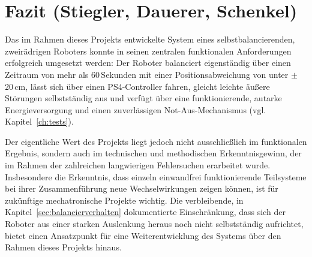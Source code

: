 \documentclass[fontsize=12pt,
parskip=half,	%
department=FakM,  %
logostyle=flat,
twoside, %
DIV=15,BCOR=10mm, %
]{OTHRreprt}
\begin{document}
\section{Fazit (Stiegler, Dauerer, Schenkel)}
\label{sec:fazit}

Das im Rahmen dieses Projekts entwickelte System eines selbstbalancierenden, zweirädrigen Roboters konnte in seinen zentralen funktionalen Anforderungen erfolgreich umgesetzt werden: Der Roboter balanciert eigenständig über einen Zeitraum von mehr als 60\,Sekunden mit einer Positionsabweichung von unter $\pm$20\,cm, lässt sich über einen PS4-Controller fahren, gleicht leichte äußere Störungen selbstständig aus und verfügt über eine funktionierende, autarke Energieversorgung und einen zuverlässigen Not-Aus-Mechanismus (vgl. Kapitel~\ref{ch:tests}).

Der eigentliche Wert des Projekts liegt jedoch nicht ausschließlich im funktionalen Ergebnis, sondern auch im technischen und methodischen Erkenntnisgewinn, der im Rahmen der zahlreichen langwierigen Fehlersuchen erarbeitet wurde. Insbesondere die Erkenntnis, dass einzeln einwandfrei funktionierende Teilsysteme bei ihrer Zusammenführung neue Wechselwirkungen zeigen können, ist für zukünftige mechatronische Projekte wichtig. Die verbleibende, in Kapitel~\ref{sec:balancierverhalten} dokumentierte Einschränkung, dass sich der Roboter aus einer starken Auslenkung heraus noch nicht selbstständig aufrichtet, bietet einen Ansatzpunkt für eine Weiterentwicklung des Systems über den Rahmen dieses Projekts hinaus.



	\newpage

	
	
	

	\listoffigures


	\listoftables
\end{document}
